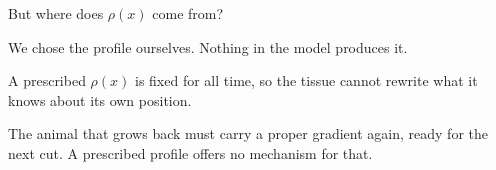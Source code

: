 \begin{frame}{But where does $\rho(x)$ come from?}

  \vspace{0.20cm}

    {We chose the profile ourselves. Nothing in the model produces it.}

  \vspace{0.14cm}

    {A prescribed $\rho(x)$ is fixed for all time, so the tissue cannot
     rewrite what it knows about its own position.}

  \vspace{0.14cm}

    {The animal that grows back must carry a proper gradient again, ready
     for the next cut. A prescribed profile offers no mechanism for that.}

  \vspace{0.30cm}


\end{frame}


